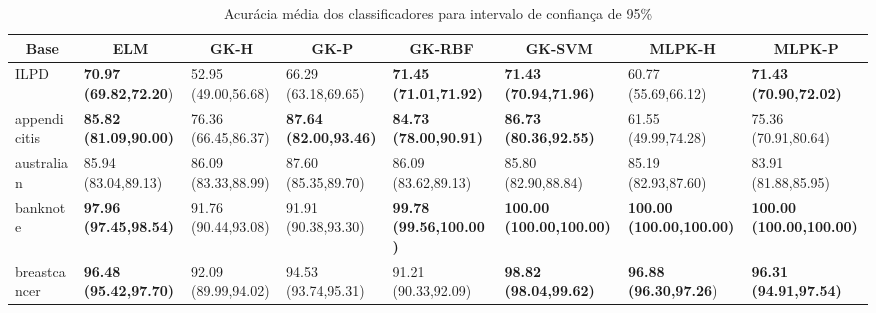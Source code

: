 \documentclass[conference]{IEEEtran}
\begin{document}
	\begin{table*}[thpbh]
		\caption{Acurácia média dos classificadores para intervalo de confiança de 95\%}
		\label{tab:results}
		\begin{adjustbox}{width=1\textwidth}
			
		\begin{tabular}{@{}cccccccc@{}}
			\toprule
			\textbf{Base}                               & \textbf{ELM}                             & \textbf{GK-H}                            & \textbf{GK-P}                            & \textbf{GK-RBF}                           & \textbf{GK-SVM}                             & \textbf{MLPK-H}                             & \textbf{MLPK-P}                             \\ \midrule
			\multicolumn{1}{|l|}{ILPD}         & \multicolumn{1}{l|}{\textbf{70.97 (69.82,72.20})} & \multicolumn{1}{l|}{52.95 (49.00,56.68)} & \multicolumn{1}{l|}{66.29 (63.18,69.65)} & \multicolumn{1}{l|}{\textbf{71.45 (71.01,71.92)}}  & \multicolumn{1}{l|}{\textbf{71.43 (70.94,71.96)}}    & \multicolumn{1}{l|}{60.77 (55.69,66.12)}    & \multicolumn{1}{l|}{\textbf{71.43 (70.90,72.02)}}    \\ \midrule
			\multicolumn{1}{|l|}{appendicitis} & \multicolumn{1}{l|}{\textbf{85.82 (81.09,90.00)}} & \multicolumn{1}{l|}{76.36 (66.45,86.37)} & \multicolumn{1}{l|}{\textbf{87.64 (82.00,93.46)}} & \multicolumn{1}{l|}{\textbf{84.73 (78.00,90.91)}}  & \multicolumn{1}{l|}{\textbf{86.73 (80.36,92.55)}}    & \multicolumn{1}{l|}{61.55 (49.99,74.28)}    & \multicolumn{1}{l|}{75.36 (70.91,80.64)}    \\ \midrule
			\multicolumn{1}{|l|}{australian}   & \multicolumn{1}{l|}{85.94 (83.04,89.13)} & \multicolumn{1}{l|}{86.09 (83.33,88.99)} & \multicolumn{1}{l|}{87.60 (85.35,89.70)} & \multicolumn{1}{l|}{86.09 (83.62,89.13)}  & \multicolumn{1}{l|}{85.80 (82.90,88.84)}    & \multicolumn{1}{l|}{85.19 (82.93,87.60)}    & \multicolumn{1}{l|}{83.91 (81.88,85.95)}    \\ \midrule
			\multicolumn{1}{|l|}{banknote}    & \multicolumn{1}{l|}{\textbf{97.96 (97.45,98.54)}} & \multicolumn{1}{l|}{91.76 (90.44,93.08)} & \multicolumn{1}{l|}{91.91 (90.38,93.30)} & \multicolumn{1}{l|}{\textbf{99.78 (99.56,100.00)}} & \multicolumn{1}{l|}{\textbf{100.00 (100.00,100.00)}} & \multicolumn{1}{l|}{\textbf{100.00 (100.00,100.00)}} & \multicolumn{1}{l|}{\textbf{100.00 (100.00,100.00)}} \\ \midrule
			\multicolumn{1}{|l|}{breastcancer} & \multicolumn{1}{l|}{\textbf{96.48 (95.42,97.70)}} & \multicolumn{1}{l|}{92.09 (89.99,94.02)} & \multicolumn{1}{l|}{94.53 (93.74,95.31)} & \multicolumn{1}{l|}{91.21 (90.33,92.09)}  & \multicolumn{1}{l|}{\textbf{98.82 (98.04,99.62)}}    & \multicolumn{1}{l|}{\textbf{96.88 (96.30,97.26})}    & \multicolumn{1}{l|}{\textbf{96.31 (94.91,97.54)}}    \\ \midrule

\end{tabular}
\end{adjustbox}
\end{table*}
\end{document}
